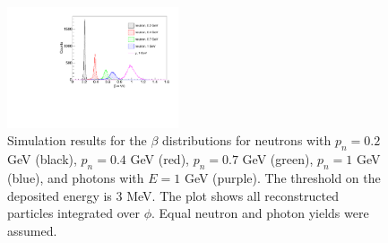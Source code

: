 \begin{figure}[htb]  
\begin{center}
\includegraphics[width=0.45\textwidth]{Figure/Figure42.pdf}
\caption {Simulation results for the $\beta$ distributions for neutrons with $p_n=0.2$ GeV (black), $p_n=0.4$ GeV (red), $p_n=0.7$ GeV (green), $p_n=1$ GeV (blue), and photons with $E=1$ GeV (purple). The threshold on the deposited energy is 3 MeV. The plot shows all reconstructed particles integrated over $\phi$. Equal neutron and photon yields were assumed.}
\label{beta_n_g}
\end{center}
\end{figure}

